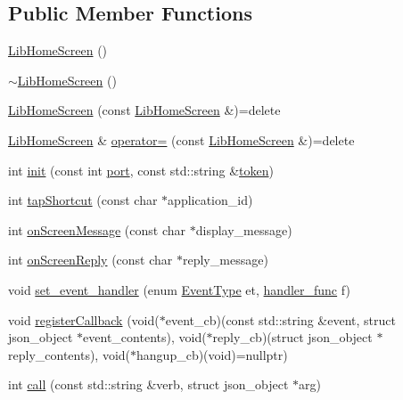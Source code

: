 \subsection*{Public Member Functions}
\begin{DoxyCompactItemize}
\item 
\hyperlink{class_lib_home_screen_a724bd949c4154fad041f96a15ef0f5dc}{Lib\+Home\+Screen} ()
\item 
\hyperlink{class_lib_home_screen_a249902aebf71a5383ca8ec6ae558d095}{$\sim$\+Lib\+Home\+Screen} ()
\item 
\hyperlink{class_lib_home_screen_a0fff2f703c8ce184eb9edd133e0f4137}{Lib\+Home\+Screen} (const \hyperlink{class_lib_home_screen}{Lib\+Home\+Screen} \&)=delete
\item 
\hyperlink{class_lib_home_screen}{Lib\+Home\+Screen} \& \hyperlink{class_lib_home_screen_a23bc17798453cfca50904562736f6b25}{operator=} (const \hyperlink{class_lib_home_screen}{Lib\+Home\+Screen} \&)=delete
\item 
int \hyperlink{class_lib_home_screen_a6a57b573cc767725762ba9beab032220}{init} (const int \hyperlink{simple-egl_8cpp_a300b6806fe6818927fe4df08f2398124}{port}, const std\+::string \&\hyperlink{simple-egl_8cpp_a623ef6987ef3bd185c07b28b13e46d34}{token})
\item 
int \hyperlink{class_lib_home_screen_a6ca8ff4a2aa019a735afaff713e0ef44}{tap\+Shortcut} (const char $\ast$application\+\_\+id)
\item 
int \hyperlink{class_lib_home_screen_ac336482036a72b51a822725f1929523c}{on\+Screen\+Message} (const char $\ast$display\+\_\+message)
\item 
int \hyperlink{class_lib_home_screen_a6c065f41f2c5d1f58d2763bfb4da9c37}{on\+Screen\+Reply} (const char $\ast$reply\+\_\+message)
\item 
void \hyperlink{class_lib_home_screen_ab1b0e08bf35415de9064afed899e9f85}{set\+\_\+event\+\_\+handler} (enum \hyperlink{class_lib_home_screen_a82616c91ac211d2ad08e709b524bf154}{Event\+Type} et, \hyperlink{class_lib_home_screen_a334f11f81c84c98d18284215dcaada3a}{handler\+\_\+func} f)
\item 
void \hyperlink{class_lib_home_screen_a2789e8a5372202cc36f48e71dbb9b7cf}{register\+Callback} (void($\ast$event\+\_\+cb)(const std\+::string \&event, struct json\+\_\+object $\ast$event\+\_\+contents), void($\ast$reply\+\_\+cb)(struct json\+\_\+object $\ast$reply\+\_\+contents), void($\ast$hangup\+\_\+cb)(void)=nullptr)
\item 
int \hyperlink{class_lib_home_screen_a527b49dcfe581be6275d0eb2236ba37f}{call} (const std\+::string \&verb, struct json\+\_\+object $\ast$arg)

\end{DoxyCompactItemize}
